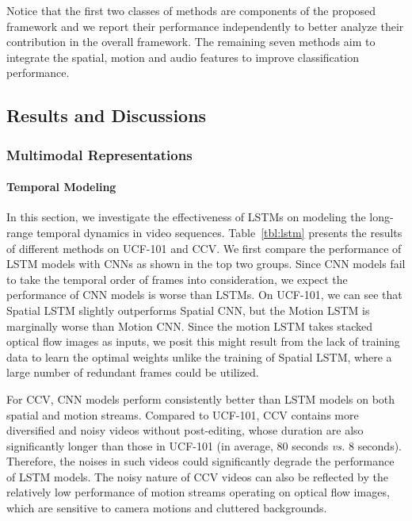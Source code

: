 \documentclass[journal]{IEEEtran}
\begin{document}
Notice that the first two classes of methods are components of the proposed framework and we report their performance independently to better analyze their contribution in the overall framework. The remaining seven methods aim to integrate the spatial, motion and audio features to improve classification performance.


\subsection{Results and Discussions}
\subsubsection{Multimodal Representations}
\paragraph{Temporal Modeling} In this section, we investigate the effectiveness of LSTMs on modeling the long-range temporal dynamics in video sequences. Table~\ref{tbl:lstm} presents the results of different methods on UCF-101 and CCV. We first compare the performance of LSTM models with CNNs as shown in the top two groups. Since CNN models fail to take the temporal order of frames into consideration, we expect the performance of CNN models is worse than LSTMs. On UCF-101, we can see that Spatial LSTM slightly outperforms Spatial CNN, but the Motion LSTM is marginally worse than Motion CNN. Since the motion LSTM takes stacked optical flow images as inputs, we posit this might result from the lack of training data to learn the optimal weights unlike the training of Spatial LSTM, where a large number of redundant frames could be utilized.

For CCV, CNN models perform consistently better than LSTM models on both spatial and motion streams. Compared to UCF-101, CCV contains more diversified and noisy videos without post-editing, whose duration are also significantly longer than those in UCF-101 (in average, 80 seconds \textit{vs.} 8 seconds). Therefore, the noises in such videos could significantly degrade the performance of LSTM models. The noisy nature of CCV videos can also be reflected by the relatively low performance of motion streams operating on optical flow images, which are sensitive to camera motions and cluttered backgrounds.
\end{document}
